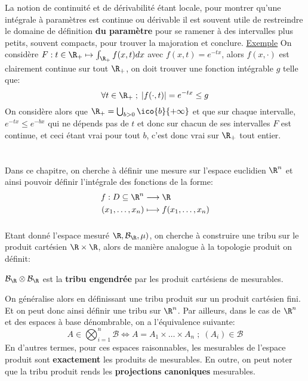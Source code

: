 \subsection*{}
La notion de continuité et de dérivabilité étant locale, pour montrer qu'une intégrale à paramètres est continue ou dérivable il est souvent utile de restreindre le domaine de définition \textbf{du paramètre} pour se ramener à des intervalles plus petits, souvent compacts, pour trouver la majoration et conclure.\<
\uline{Exemple} On considère \(F : t \in \R_+ \mapsto \int_{\R_+} f(x, t)dx\) avec \(f(x, t) = e^{-tx}\), alors \(f(x, \cdot)\) est clairement continue sur tout \(\R_+\), on doit trouver une fonction intégrable \(g\) telle que:
\[
   \forall t \in \R_+ \; ; \; |f(\cdot, t)| = e^{-tx} \leq g
\]
On considère alors que \(\R_+ = \bigcup_{b > 0} \ico{b}{+\infty}\) et que sur chaque intervalle, \(e^{-tx} \leq e^{-bx}\) qui ne dépends pas de \(t\) et donc sur chacun de ses intervalles \(F\) est continue, et ceci étant vrai pour tout \(b\), c'est donc vrai sur \(\R_+\) tout entier.
\chapter*{} %
Dans ce chapitre, on cherche à définir une mesure sur l'espace euclidien \( \R^n \) et ainsi pouvoir définir l'intégrale des fonctions de la forme:
\[ 
   \begin{aligned}
      f : D \subseteq \R^n &\longrightarrow \R\\
      (x_1, \ldots, x_n) &\longmapsto f(x_1, \ldots, x_n)
   \end{aligned}
\]

\subsection*{}
Etant donné l'espace mesuré \(  \R, \mathcal{B}_{ \R}, \mu) \), on cherche à construire une tribu sur le produit cartésien \( \R \times \R \), alors de manière analogue à la topologie produit on définit:
\begin{center}
   \(    \mathcal{B}_{ \R} \otimes \mathcal{B}_{ \R}  \) est la \textbf{tribu engendrée} par les produit cartésiens de mesurables.
\end{center} 
On généralise alors en définissant une tribu produit sur un produit cartésien fini. Et on peut donc ainsi définir une tribu sur \( \R^n \). Par ailleurs, dans le cas de \( \R^n \) et des espaces à base dénombrable, on a l'équivalence suivante:
\[ 
   A \in \bigotimes_{i=1}^n \mathcal{B} \iff A = A_1 \times \ldots \times A_n \; ; \; (A_i) \in \mathcal{B} 
\]
En d'autres termes, pour ces espaces raisonnables, les mesurables de l'espace produit sont \textbf{exactement} les produits de mesurables. En outre, on peut noter que la tribu produit rends les \textbf{projections canoniques} mesurables.

